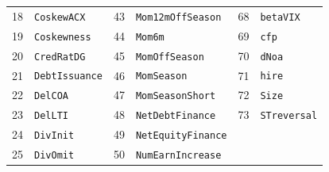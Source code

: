 \begin{table}[htbp]
\begin{tabular}{@{} r l | r l | r l @{}}
    18 & \texttt{CoskewACX} &     43 & \texttt{Mom12mOffSeason} &     68 & \texttt{betaVIX} \\
    19 & \texttt{Coskewness} &     44 & \texttt{Mom6m} &     69 & \texttt{cfp} \\
    20 & \texttt{CredRatDG} &     45 & \texttt{MomOffSeason} &     70 & \texttt{dNoa} \\
    21 & \texttt{DebtIssuance} &     46 & \texttt{MomSeason} &     71 & \texttt{hire} \\
    22 & \texttt{DelCOA} &     47 & \texttt{MomSeasonShort} &     72 & \texttt{Size} \\
    23 & \texttt{DelLTI} &     48 & \texttt{NetDebtFinance} &     73 & \texttt{STreversal} \\
    24 & \texttt{DivInit} &     49 & \texttt{NetEquityFinance} &       &           \\
    25 & \texttt{DivOmit} &     50 & \texttt{NumEarnIncrease} &       &           \\
    \bottomrule
  \end{tabular}
\end{table}
